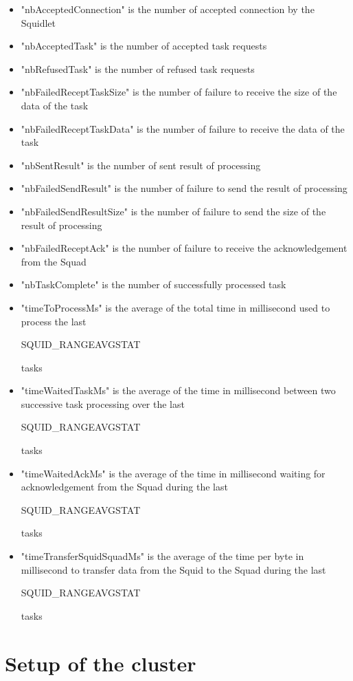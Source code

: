 \begin{itemize}
\item "nbAcceptedConnection" is the number of accepted connection by the Squidlet
\item "nbAcceptedTask" is the number of accepted task requests
\item "nbRefusedTask" is the number of refused task requests
\item "nbFailedReceptTaskSize" is the number of failure to receive the size of the data of the task
\item "nbFailedReceptTaskData" is the number of failure to receive the data of the task
\item "nbSentResult" is the number of sent result of processing
\item "nbFailedSendResult" is the number of failure to send the result of processing
\item "nbFailedSendResultSize" is the number of failure to send the size of the result of processing
\item "nbFailedReceptAck" is the number of failure to receive the acknowledgement from the Squad
\item "nbTaskComplete" is the number of successfully processed task
\item "timeToProcessMs" is the average of the total time in millisecond used to process the last \begin{ttfamily}SQUID\_RANGEAVGSTAT\end{ttfamily} tasks
\item "timeWaitedTaskMs" is the average of the time in millisecond between two successive task processing over the last \begin{ttfamily}SQUID\_RANGEAVGSTAT\end{ttfamily} tasks
\item "timeWaitedAckMs" is the average of the time in millisecond waiting for acknowledgement from the Squad during the last \begin{ttfamily}SQUID\_RANGEAVGSTAT\end{ttfamily} tasks
\item "timeTransferSquidSquadMs" is the average of the time per byte in millisecond to transfer data from the Squid to the Squad during the last \begin{ttfamily}SQUID\_RANGEAVGSTAT\end{ttfamily} tasks
\end{itemize}

\section{Setup of the cluster}

